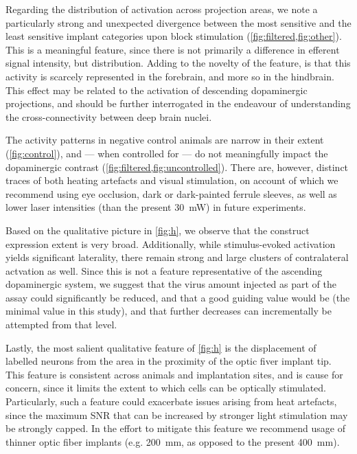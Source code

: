 Regarding the distribution of activation across projection areas, we note a particularly strong and unexpected divergence between the most sensitive and the least sensitive implant categories upon block stimulation (\cref{fig:filtered,fig:other}).
This is a meaningful feature, since there is not primarily a difference in efferent signal intensity, but distribution.
Adding to the novelty of the feature, is that this activity is scarcely represented in the forebrain, and more so in the hindbrain.
This effect may be related to the activation of descending dopaminergic projections, and should be further interrogated in the endeavour of understanding the cross-connectivity between deep brain nuclei.

The activity patterns in negative control animals are narrow in their extent (\cref{fig:control}), and --- when controlled for --- do not meaningfully impact the dopaminergic contrast (\cref{fig:filtered,fig:uncontrolled}).
There are, however, distinct traces of both heating artefacts and visual stimulation, on account of which we recommend using eye occlusion, dark or dark-painted ferrule sleeves, as well as lower laser intensities (than the present \SI{30}{\milli\watt}) in future experiments.

Based on the qualitative picture in \cref{fig:h}, we observe that the construct expression extent is very broad.
Additionally, while stimulus-evoked activation yields significant laterality, there remain strong and large clusters of contralateral actvation as well.
Since this is not a feature representative of the ascending dopaminergic system, we suggest that the virus amount injected as part of the assay could significantly be reduced, and that a good guiding value would be
 (the minimal value in this study),
and that further decreases can incrementally be attempted from that level.

Lastly, the most salient qualitative feature of \cref{fig:h} is the displacement of labelled neurons from the area in the proximity of the optic fiver implant tip.
This feature is consistent across animals and implantation sites, and is cause for concern, since it limits the extent to which cells can be optically stimulated.
Particularly, such a feature could exacerbate issues arising from heat artefacts, since the maximum SNR that can be increased by stronger light stimulation may be strongly capped.
In the effort to mitigate this feature we recommend usage of thinner optic fiber implants (e.g. \SI{200}{\milli\meter}, as opposed to the present \SI{400}{\milli\meter}).
